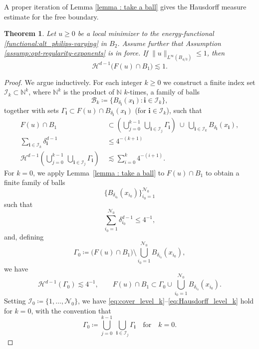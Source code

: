 \documentclass[reqno,11pt]{amsart}
\newtheorem{theorem}{Theorem}[section]
\newcommand{\1}{\mathds{1}}  %
\numberwithin{equation}{section}
\begin{document}
A proper iteration of Lemma \ref{lemma : take a ball} gives the Hausdorff measure estimate for the free boundary.

\begin{theorem}\label{thm:Hdminus1_bound_freebdry}
Let $u \geq 0$ be a local minimizer to the energy-functional \eqref{functional:alt_philips-varying} in $B_2$. Assume further that Assumption \eqref{assump:opt-regularity-exponents} is in force. If $\|u\|_{L^\infty(B_{4/3})} \leq 1$, then
\[
    \mathcal H^{d-1}\bigl(F(u)\cap B_1\bigr)\lesssim 1.
\]
\end{theorem}

\begin{proof}
We argue inductively. For each integer $k\ge 0$ we construct a finite index set $\mathcal I_k \subset \mathbb{N}^k$, where $\mathbb{N}^k$ is the product of $\mathbb{N}$ $k$-times, a family of balls
\[
    \mathcal B_k \coloneqq \bigl\{B_{\delta_{\mathbf i}}(x_{\mathbf i}) \colon \mathbf i\in\mathcal I_k\bigr\},
\]
together with sets $\Gamma_{\mathbf i}\subset F(u)\cap B_{\delta_{\mathbf i}}(x_{\mathbf i})$ (for $\mathbf i\in\mathcal I_k$), such that
\begin{align}
F(u)\cap B_1
&\subset \left(\bigcup_{j=0}^{k-1}\ \bigcup_{\mathbf i\in\mathcal I_j}\Gamma_{\mathbf i}\right)\ \cup\ \bigcup_{\mathbf i\in\mathcal I_k} B_{\delta_{\mathbf i}}(x_{\mathbf i}),
\label{eq:cover_level_k}\\[2mm]
\sum_{\mathbf i\in\mathcal I_k}\delta_{\mathbf i}^{d-1}
&\le 4^{-(k+1)} \label{eq:radii_level_k}\\[2mm]
\mathcal{H}^{d-1} \left(\bigcup_{j=0}^{k-1}\ \bigcup_{\mathbf i\in\mathcal I_j}\Gamma_{\mathbf i}\right)\
&\lesssim \sum_{i=0}^{k} 4^{-(i+1)}.
\label{eq:Hausdorff_level_k}
\end{align}
For $k=0$, we apply Lemma~\ref{lemma : take a ball} to $F(u)\cap B_1$ to obtain a finite family of balls
\[
    \bigl\{B_{\delta_{i_0}}(x_{i_0})\bigr\}_{i_0=1}^{\mathcal N_0}
\]
such that
\begin{equation}\label{eq:gen0_radii}
    \sum_{i_0=1}^{\mathcal N_0}\delta_{i_0}^{d-1}\le 4^{-1},
\end{equation}
and, defining
\[
    \Gamma_0 \coloneqq \bigl(F(u)\cap B_1\bigr)\setminus \bigcup_{i_0=1}^{\mathcal N_0} B_{\delta_{i_0}}(x_{i_0}),
\]
we have
\begin{equation}\label{eq:gen0_Gamma}
\mathcal H^{d-1}(\Gamma_0)\lesssim 4^{-1},
\qquad
F(u)\cap B_1 \subset \Gamma_0\cup \bigcup_{i_0=1}^{\mathcal N_0} B_{\delta_{i_0}}(x_{i_0}).
\end{equation}
Setting $\mathcal I_0\coloneqq \{1,\dots,\mathcal N_0\}$, we have \eqref{eq:cover_level_k}--\eqref{eq:Hausdorff_level_k} hold for $k=0$, with the convention that
\[
	\Gamma_0 \coloneqq \bigcup_{j=0}^{k-1}\ \bigcup_{\mathbf i\in\mathcal I_j}\Gamma_{\mathbf i}  \quad \text{for} \quad k = 0.
\]


\end{proof}
\end{document}
